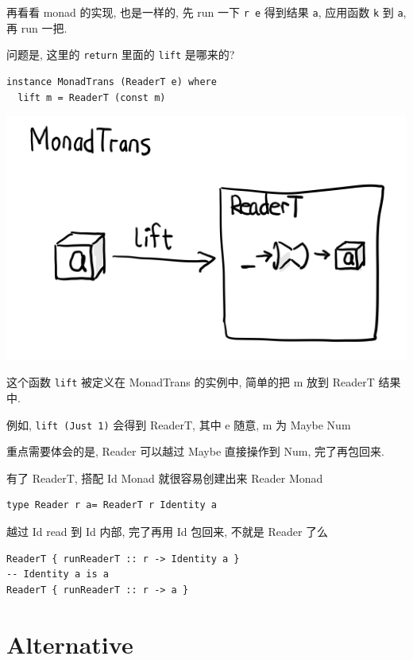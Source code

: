 \documentclass[11pt]{tufte-book}
\begin{document}
再看看 monad 的实现, 也是一样的, 先 run 一下 \texttt{r e} 得到结果 \texttt{a}, 应用函数 \texttt{k} 到 \texttt{a}, 再 run 一把.


问题是, 这里的 \texttt{return} 里面的 \texttt{lift} 是哪来的?

\begin{verbatim}
instance MonadTrans (ReaderT e) where
  lift m = ReaderT (const m)
\end{verbatim}

\begin{center}
\includegraphics[width=.9\linewidth]{images/p3-MonadTrans-ReaderT-e-m.png}
\end{center}

这个函数 \texttt{lift} 被定义在 MonadTrans 的实例中, 简单的把 m 放到 ReaderT 结果中.

例如, \texttt{lift (Just 1)} 会得到 ReaderT, 其中 e 随意, m 为 Maybe Num

重点需要体会的是, Reader 可以越过 Maybe 直接操作到 Num, 完了再包回来.

有了 ReaderT, 搭配 Id Monad 就很容易创建出来 Reader Monad

\begin{verbatim}
type Reader r a= ReaderT r Identity a
\end{verbatim}

越过 Id read 到 Id 内部, 完了再用 Id 包回来, 不就是 Reader 了么

\begin{verbatim}
ReaderT { runReaderT :: r -> Identity a }
-- Identity a is a
ReaderT { runReaderT :: r -> a }
\end{verbatim}

\chapter{Alternative}
\label{sec:org615f36e}
\end{document}

